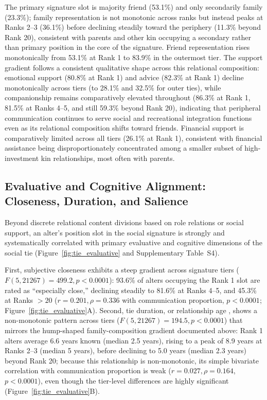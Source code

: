 \documentclass[11pt,letterpaper]{article}
\begin{document}
The primary signature slot is majority friend (53.1\%) and only secondarily family (23.3\%); family representation is not monotonic across ranks but instead peaks at Ranks 2--3 (36.1\%) before declining steadily toward the periphery (11.3\% beyond Rank 20), consistent with parents and other kin occupying a secondary rather than primary position in the core of the signature. Friend representation rises monotonically from 53.1\% at Rank 1 to 83.9\% in the outermost tier. The support gradient follows a consistent qualitative shape across this relational composition: emotional support (80.8\% at Rank 1) and advice (82.3\% at Rank 1) decline monotonically across tiers (to 28.1\% and 32.5\% for outer ties), while companionship remains comparatively elevated throughout (86.3\% at Rank 1, 81.5\% at Ranks 4--5, and still 59.3\% beyond Rank 20), indicating that peripheral communication continues to serve social and recreational integration functions even as its relational composition shifts toward friends. Financial support is comparatively limited across all tiers (26.1\% at Rank 1), consistent with financial assistance being disproportionately concentrated among a smaller subset of high-investment kin relationships, most often with parents.

\subsection{Evaluative and Cognitive Alignment: Closeness, Duration, and Salience}

Beyond discrete relational content divisions based on role relations or social support, an alter's position slot in the social signature is strongly and systematically correlated with primary evaluative and cognitive dimensions of the social tie (Figure~\ref{fig:tie_evaluative} and Supplementary Table~S4). 

First, subjective closeness \citep{marsden1984measuring-f62} exhibits a steep gradient across signature tiers ($F(5,21267) = 499.2, p < 0.0001$): 93.6\% of alters occupying the Rank 1 slot are rated as ``especially close,'' declining steadily to 81.6\% at Ranks 4--5, and 45.3\% at Ranks $>20$ ($r = 0.201, \rho = 0.336$ with communication proportion, $p < 0.0001$; Figure~\ref{fig:tie_evaluative}A). Second, tie duration, or relationship age \citep{burt2000decay-f08}, shows a non-monotonic pattern across tiers ($F(5,21267) = 194.5, p < 0.0001$) that mirrors the hump-shaped family-composition gradient documented above: Rank 1 alters average 6.6 years known (median 2.5 years), rising to a peak of 8.9 years at Ranks 2--3 (median 5 years), before declining to 5.0 years (median 2.3 years) beyond Rank 20; because this relationship is non-monotonic, its simple bivariate correlation with communication proportion is weak ($r = 0.027, \rho = 0.164$, $p < 0.0001$), even though the tier-level differences are highly significant (Figure~\ref{fig:tie_evaluative}B). 
\end{document}
